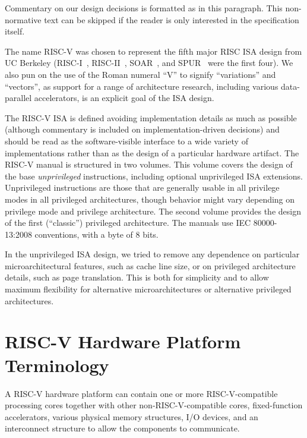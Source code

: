 \begin{commentary}
  Commentary on our design decisions is formatted as in this
  paragraph.  This non-normative text can be skipped if the reader is
  only interested in the specification itself.
\end{commentary}
\begin{commentary}
The name RISC-V was chosen to represent the fifth major RISC ISA
design from UC Berkeley (RISC-I~\cite{riscI-isca1981},
RISC-II~\cite{Katevenis:1983}, SOAR~\cite{Ungar:1984}, and
SPUR~\cite{spur-jsscc1989} were the first four).  We also pun on the
use of the Roman numeral ``V'' to signify ``variations'' and
``vectors'', as support for a range of architecture research,
including various data-parallel accelerators, is an explicit goal of
the ISA design.
\end{commentary}

The RISC-V ISA is defined avoiding implementation details as much as
possible (although commentary is included on implementation-driven
decisions) and should be read as the software-visible interface to a
wide variety of implementations rather than as the design of a
particular hardware artifact.  The RISC-V manual is structured in two
volumes.  This volume covers the design of the base {\em unprivileged}
instructions, including optional unprivileged ISA extensions.
Unprivileged instructions are those that are generally usable in all
privilege modes in all privileged architectures, though behavior might
vary depending on privilege mode and privilege architecture.  The
second volume provides the design of the first (``classic'')
privileged architecture. The manuals use IEC 80000-13:2008
conventions, with a byte of 8 bits.

\begin{commentary}
In the unprivileged ISA design, we tried to remove any dependence on
particular microarchitectural features, such as cache line size, or on
privileged architecture details, such as page translation.  This is
both for simplicity and to allow maximum flexibility for alternative
microarchitectures or alternative privileged architectures.
\end{commentary}


\section{RISC-V Hardware Platform Terminology}

A RISC-V hardware platform can contain one or more RISC-V-compatible
processing cores together with other non-RISC-V-compatible cores,
fixed-function accelerators, various physical memory structures, I/O
devices, and an interconnect structure to allow the components to
communicate.

